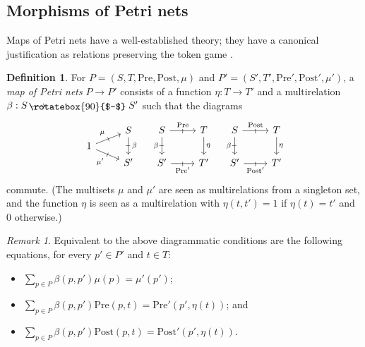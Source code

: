 \documentclass[11pt,a4paper]{article}
\theoremstyle{plain}
\theoremstyle{definition}
\newtheorem{definition}[theorem]{Definition}
\theoremstyle{remark}
\newtheorem{remark}[theorem]{Remark}
\newcommand{\Pre}{\mathrm{Pre}}
\newcommand{\Post}{\mathrm{Post}}
\newcommand{\profto}{\mathrel{\ooalign{$\longrightarrow$\cr\hfil\!\raisebox{-1.2pt}{\rotatebox{90}{$-$}}\hfil\cr}}}
\begin{document}
\subsection{Morphisms of Petri nets}
\label{subsec:morphisms}

Maps of Petri nets have a well-established theory; they have a canonical justification as relations preserving the token game \cite{winskel1984new}. 
\begin{definition}
  \label{def:morphisms-petri}
  For $P = (S, T, \Pre, \Post, \mu)$ and
  $P' = (S', T', \Pre', \Post', \mu')$, a \emph{map of Petri nets}
  $P \to P'$ consists of a function $\eta : T \rightarrow T'$  and a multirelation $\beta : S \profto S'$ such
  that the diagrams
\[\begin{tikzcd}[row sep=0.2em]
	& S \\
	1 \\
	& {S'}
	\arrow["\beta"{inner sep=.8ex}, "\shortmid"{marking}, from=1-2, to=3-2]
	\arrow["\mu"{inner sep=.8ex}, "\shortmid"{marking}, from=2-1, to=1-2]
	\arrow["{\mu'}"'{inner sep=.8ex}, "\shortmid"{marking}, from=2-1, to=3-2]
\end{tikzcd}
\quad
\begin{tikzcd}
	S & T \\
	{S'} & {T'}
	\arrow["\Pre"{inner sep=.8ex}, "\shortmid"{marking}, from=1-1, to=1-2]
	\arrow["\beta"'{inner sep=.8ex}, "\shortmid"{marking}, from=1-1, to=2-1]
	\arrow["\eta", from=1-2, to=2-2]
	\arrow["{\Pre'}"'{inner sep=.8ex}, "\shortmid"{marking}, from=2-1, to=2-2]
\end{tikzcd}\quad
\begin{tikzcd}
	S & T \\
	{S'} & {T'}
	\arrow["\Post"{inner sep=.8ex}, "\shortmid"{marking}, from=1-1, to=1-2]
	\arrow["\beta"'{inner sep=.8ex}, "\shortmid"{marking}, from=1-1, to=2-1]
	\arrow["\eta", from=1-2, to=2-2]
	\arrow["{\Post'}"'{inner sep=.8ex}, "\shortmid"{marking}, from=2-1, to=2-2]
\end{tikzcd}
\]
commute. (The multisets $\mu$ and $\mu'$ are seen as multirelations from a singleton set, and the function $\eta$ is seen as a multirelation with
$\eta(t, t') = 1$ if $\eta(t) = t'$ and $0$ otherwise.)
\end{definition}
\begin{remark}
Equivalent to the above diagrammatic conditions are the following equations, for every $p' \in P'$ and $t \in T$:
\begin{itemize}
    \item $\sum_{p \in P} \beta(p, p')\mu(p) = \mu'(p')$;
    \item $\sum_{p \in P}\beta(p, p') \Pre(p, t) = \Pre'(p',\eta(t))$; and 
    \item $\sum_{p \in P}\beta(p, p')\Post(p, t) = \Post'(p',\eta(t))$.
\end{itemize}
\end{remark}
\end{document}
